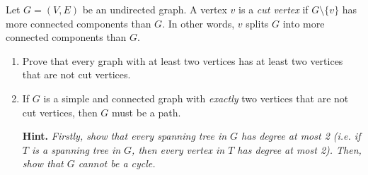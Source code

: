 \documentclass{article}
\begin{document}
\begin{question}
Let $G = (V, E)$ be an undirected graph. A vertex $v$ is a {\em cut vertex} if $G \setminus \{v\}$ has more connected components than $G$. In other words, $v$ splits $G$ into more connected components than $G$.

\begin{enumerate}[label = (\alph*)]
    \item Prove that every graph with at least two vertices has at least two vertices that are not cut vertices.

    \item If $G$ is a simple and connected graph with {\em exactly} two vertices that are not cut vertices, then $G$ must be a path.

    {\bfseries Hint.} {\em Firstly, show that every spanning tree in $G$ has degree at most 2 (i.e. if $T$ is a spanning tree in $G$, then every vertex in $T$ has degree at most 2). Then, show that $G$ cannot be a cycle.}
\end{enumerate}
\end{question}
\end{document}
